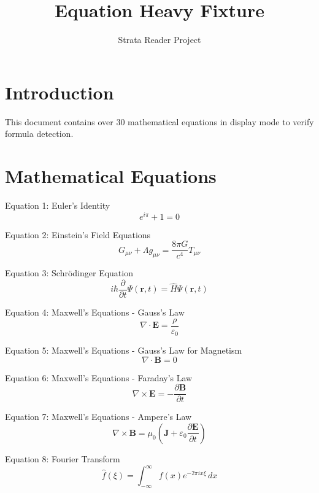 \documentclass{article}
\title{Equation Heavy Fixture}
\author{Strata Reader Project}
\begin{document}
\maketitle

\section{Introduction}
This document contains over 30 mathematical equations in display mode to verify formula detection.

\section{Mathematical Equations}

Equation 1: Euler's Identity
\begin{equation}
e^{i\pi} + 1 = 0
\end{equation}

Equation 2: Einstein's Field Equations
\begin{equation}
G_{\mu\nu} + \Lambda g_{\mu\nu} = \frac{8\pi G}{c^4} T_{\mu\nu}
\end{equation}

Equation 3: Schrödinger Equation
\begin{equation}
i\hbar \frac{\partial}{\partial t} \Psi(\mathbf{r}, t) = \hat{H} \Psi(\mathbf{r}, t)
\end{equation}

Equation 4: Maxwell's Equations - Gauss's Law
\begin{equation}
\nabla \cdot \mathbf{E} = \frac{\rho}{\varepsilon_0}
\end{equation}

Equation 5: Maxwell's Equations - Gauss's Law for Magnetism
\begin{equation}
\nabla \cdot \mathbf{B} = 0
\end{equation}

Equation 6: Maxwell's Equations - Faraday's Law
\begin{equation}
\nabla \times \mathbf{E} = -\frac{\partial \mathbf{B}}{\partial t}
\end{equation}

Equation 7: Maxwell's Equations - Ampere's Law
\begin{equation}
\nabla \times \mathbf{B} = \mu_0 \left( \mathbf{J} + \varepsilon_0 \frac{\partial \mathbf{E}}{\partial t} \right)
\end{equation}

Equation 8: Fourier Transform
\begin{equation}
\hat{f}(\xi) = \int_{-\infty}^{\infty} f(x) e^{-2\pi i x \xi} \, dx
\end{equation}
\end{document}
